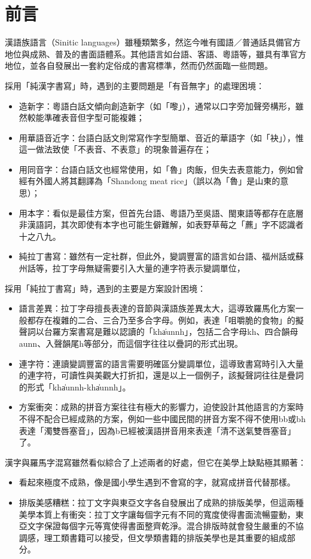 \section*{前言}

漢語族語言（Sinitic languages）雖種類繁多，然迄今唯有國語／普通話具備官方地位與成熟、普及的書面語體系。其他語言如台語、客語、粵語等，雖具有準官方地位，並各自發展出一套約定俗成的書寫標準，然而仍然面臨一些問題。\par
採用「純漢字書寫」時，遇到的主要問題是「有音無字」的處理困境：\par
\begin{itemize}
	\item 造新字：粵語白話文傾向創造新字（如「嚟」），通常以口字旁加聲旁構形，雖然較能準確表音但字型可能複雜；
	\item 用華語音近字：台語白話文則常寫作字型簡單、音近的華語字（如「袂」），惟這一做法致使「不表音、不表意」的現象普遍存在；
	\item 用同音字：台語白話文也經常使用，如「魯」肉飯，但失去表意能力，例如曾經有外國人將其翻譯為「Shandong meat rice」（誤以為「魯」是山東的意思）；
	\item 用本字：看似是最佳方案，但首先台語、粵語乃至吳語、閩東語等都存在底層非漢語詞，其次即使有本字也可能生僻難解，如表野草莓之「藨」字不認識者十之八九。
	\item 純拉丁書寫：雖然有一定社群，但此外，變調豐富的語言如台語、福州話或蘇州話等，拉丁字母無疑需要引入大量的連字符表示變調單位，
\end{itemize}
採用「純拉丁書寫」時，遇到的主要是方案設計困境：\par
\begin{itemize}
	\item 語言差異：拉丁字母擅長表達的音節與漢語族差異太大，這導致羅馬化方案一般都存在複雜的二合、三合乃至多合字母。例如，表達「咀嚼脆的食物」的擬聲詞以台羅方案書寫是難以認讀的「kha̍unnh」，包括二合字母kh、四合韻母aunn、入聲韻尾h等部分，而這個字往往以疊詞的形式出現。
	\item 連字符：連讀變調豐富的語言需要明確區分變調單位，這導致書寫時引入大量的連字符，可讀性與美觀大打折扣，還是以上一個例子，該擬聲詞往往是疊詞的形式「kha̍unnh-kha̍unnh」。
	\item 方案衝突：成熟的拼音方案往往有極大的影響力，迫使設計其他語言的方案時不得不配合已經成熟的方案，例如一些中國民間的拼音方案不得不使用bb或bh表達「濁雙唇塞音」，因為b已經被漢語拼音用來表達「清不送氣雙唇塞音」了。
\end{itemize}

漢字與羅馬字混寫雖然看似綜合了上述兩者的好處，但它在美學上缺點極其顯著：
\begin{itemize}
	\item 看起來極度不成熟，像是國小學生遇到不會寫的字，就寫成拼音代替那樣。
	\item 排版美感糟糕：拉丁文字與東亞文字各自發展出了成熟的排版美學，但這兩種美學本質上有衝突：拉丁文字讓每個字元有不同的寬度使得書面流暢靈動，東亞文字保證每個字元等寬使得書面整齊乾淨。混合排版時就會發生嚴重的不協調感，理工類書籍可以接受，但文學類書籍的排版美學也是其重要的組成部分。
\end{itemize}

